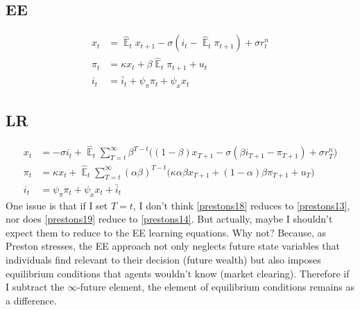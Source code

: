 \documentclass[11pt]{article}
\renewcommand{\[}{\begin{equation}}
\renewcommand{\]}{\end{equation}}
\DeclareMathOperator{\E}{\mathbb{E}}
\begin{document}
\subsection{EE}
\begin{align}
x_t &= \hat{\E}_t x_{t+1} - \sigma(i_t - \hat{\E}_t \pi_{t+1}) +\sigma r_t^n \tag{Preston, eq. (13)} \label{prestons13} \\
\pi_t &= \kappa x_t +\beta \hat{\E}_t \pi_{t+1} + u_t \tag{Preston, eq. (14)} \label{prestons14}  \\
i_t &= \bar{i}_t + \psi_{\pi}\pi_t + \psi_{x} x_t \tag{Preston, eq. (27) } 
\end{align}
\subsection{LR}
\begin{align}
x_t &=  -\sigma i_t +\hat{\E}_t \sum_{T=t}^{\infty} \beta^{T-t }\big( (1-\beta)x_{T+1} - \sigma(\beta i_{T+1} - \pi_{T+1}) +\sigma r_T^n \big) \tag{Preston, eq. (18)} \label{prestons18}  \\
\pi_t &= \kappa x_t +\hat{\E}_t \sum_{T=t}^{\infty} (\alpha\beta)^{T-t }\big( \kappa \alpha \beta x_{T+1} + (1-\alpha)\beta \pi_{T+1} + u_T\big)\tag{Preston, eq. (19)} \label{prestons19}  \\
i_t &= \psi_{\pi}\pi_t + \psi_{x} x_t + \bar{i}_t \tag{Preston, eq. (27)} 
\end{align}
One issue is that if I set $T=t$, I don't think \ref{prestons18} reduces to \ref{prestons13}, nor does \ref{prestons19} reduce to \ref{prestons14}. But actually, maybe I shouldn't expect them to reduce to the EE learning equations. Why not? Because, as Preston stresses, the EE approach not only neglects future state variables that individuals find relevant to their decision (future wealth) but also imposes equilibrium conditions that agents wouldn't know (market clearing). Therefore if I subtract the $\infty$-future element, the element of equilibrium conditions remains as a difference.
\end{document}
